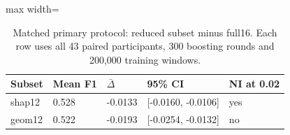 \begin{table}[htbp]
\centering\small
\caption{Matched primary protocol: reduced subset minus full16. Each row uses all 43 paired participants, 300 boosting rounds and 200,000 training windows.}\label{tab:primary}
\begin{adjustbox}{max width=\textwidth}
\begin{tabular}{lllll}\toprule
Subset & Mean F1 & $\bar\Delta$ & 95\% CI & NI at 0.02\\\midrule
shap12 & 0.528 & -0.0133 & [-0.0160, -0.0106] & yes\\
geom12 & 0.522 & -0.0193 & [-0.0254, -0.0132] & no\\
\bottomrule\end{tabular}
\end{adjustbox}
\end{table}
